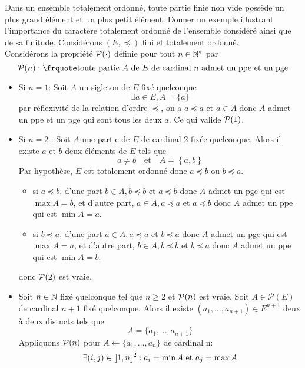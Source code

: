 \documentclass{article}
\renewenvironment{question_kholle}[2][ ]
{
	\subsection{\texorpdfstring{#2}{}}
	\notblank{#1}
	{
		\noindent #1
		\bigbreak
	}
	{}
	\begin{proof}
}
{
	\end{proof}
}
\begin{document}
\begin{question_kholle}{Dans un ensemble totalement ordonné, toute partie finie non vide possède un plus grand élément et un plus petit élément. Donner un exemple illustrant l’importance du caractère totalement ordonné de l’ensemble considéré ainsi que de sa finitude.}
	Considérons $(E,\preccurlyeq)$ fini et totalement ordonné.\\
	Considérons la propriété $\mathcal P(\cdot)$ définie pour tout $n\in\mathbb N^{*}$ par
	\[
		\prop(n) : \mathquote{toute partie $A$ de $E$ de cardinal $n$ admet un ppe et un pge}
	\]
	\begin{itemize}
		\item \underline{Si $n=1$}: Soit $A$ un sigleton de $E$ fixé quelconque
		      \[
			      \exists a\in E, A=\{a\}
		      \]
		      par réflexivité de la relation d’ordre $\preccurlyeq$, on a $a\preccurlyeq a$ et $a\in A$ donc $A$ admet un ppe et un pge qui sont tous les deux $a$. Ce qui valide $\mathcal P(1)$.
		\item \underline{Si $n=2$} : Soit $A$ une partie de $E$ de cardinal 2 fixée quelconque. Alors il existe $a$ et $b$ deux éléments de $E$ tels que
		      \[
			      a\neq b \quad \text{et} \quad A=\left\{a,b\right\}
		      \]
		      Par hypothèse, $E$ est totalement ordonné donc $a\preccurlyeq b$ ou $b\preccurlyeq a$.
		      \begin{itemize}
			      \item si $a\preccurlyeq b$, d’une part $b\in A, b\preccurlyeq b$ et $a\preccurlyeq b$ donc $A$ admet un pge qui est $\max A = b$, et d’autre part, $a\in A, a\preccurlyeq a$ et $a\preccurlyeq b$ donc $A$ admet un ppe qui est $\min A=a$.
			      \item si $b\preccurlyeq a$, d’une part $a\in A, a\preccurlyeq a$ et $b\preccurlyeq a$ donc $A$ admet un pge qui est $\max A = a$, et d’autre part, $b\in A, b\preccurlyeq b$ et $b\preccurlyeq a$ donc $A$ admet un ppe qui est $\min A=b$.
		      \end{itemize}
		      donc $\mathcal P(2)$ est vraie.
		\item Soit $n\in\mathbb N$ fixé quelconque tel que $n\geq 2$ et $\mathcal P(n)$ est vraie. Soit $A\in\mathcal{P}(E)$  de cardinal $n+1$ fixé quelconque. Alors il existe $(a_{1}, \dots, a_{n+1})\in E^{n+1}$ deux à deux distncts tels que
		      \[
			      A=\{a_{1}, \dots, a_{n+1}\}
		      \]
		      Appliquons $\mathcal P(n)$ pour $A\leftarrow \{a_{1}, \dots, a_{n}\}$ de cardinal n:
		      \[
			      \exists(i,j)\in[\![ 1,n ]\!]^{2}: a_{i}=\min A \text{ et } a_{j}=\max A
		      \]

\end{itemize}
\end{question_kholle}
\end{document}
